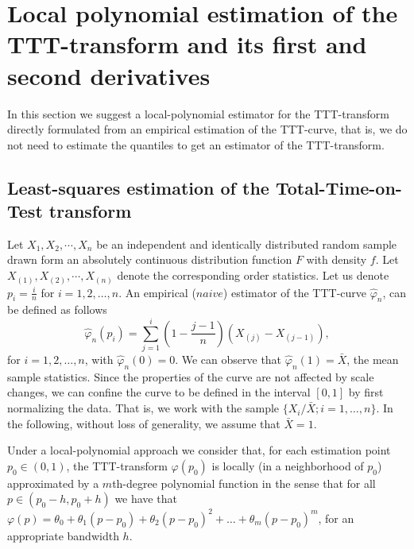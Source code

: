 \documentclass[preprint,12pt]{elsarticle}
\begin{document}
%
\section{Local polynomial estimation of the TTT-transform and its first and second derivatives}\label{locpol}
In this section we suggest a local-polynomial estimator for the TTT-transform directly formulated from an empirical estimation of the TTT-curve, that is, we do not need to estimate the quantiles to get an estimator of the TTT-transform.
%
\subsection{Least-squares estimation of the Total-Time-on-Test transform}

Let $X_1,X_2,\cdots,X_n$ be an independent and identically distributed random sample drawn form an absolutely continuous distribution function $F$ with density $f$. Let $X_{(1)},X_{(2)},\cdots,X_{(n)}$ denote the corresponding order statistics. Let us denote $p_i=\frac{i}{n}$ for $i= 1,2, \ldots, n$. An empirical ($naive$) estimator of the TTT-curve $\widehat{\varphi}_n$, can be defined as follows
%
\begin{equation}\label{empi}
\widehat{\varphi}_n\left(p_i\right)= \sum_{j=1}^i \left(1-\frac{j-1}{n}\right) \left(X_{(j)}-X_{(j-1)}\right),
\end{equation}
for $i=1,2,\ldots,n$, with $\widehat{\varphi}_n(0)=0$. We can observe that $\widehat{\varphi}_n(1)=\bar{X}$, the mean sample statistics. Since the properties of the curve are not affected by scale changes, we can confine the curve to be defined in the interval $[0,1]$ by first normalizing the data. That is, we work with the sample $\{X_i/\bar{X}; i=1,\ldots,n\}$. In the following, without loss of generality, we assume that $\bar{X}=1$.

Under a local-polynomial approach we consider that, for each estimation point $p_0 \in (0,1)$, the TTT-transform $\varphi(p_0)$ is locally (in a neighborhood of $p_0$) approximated by a $m$th-degree polynomial function in the sense that for all $p \in \left(p_0-h,p_0+h\right)$ we have that $\varphi(p)=\theta_0+\theta_1(p-p_0)+\theta_2(p-p_0)^2+\ldots+\theta_m(p-p_0)^m$, for an appropriate bandwidth $h$. 
\end{document}

